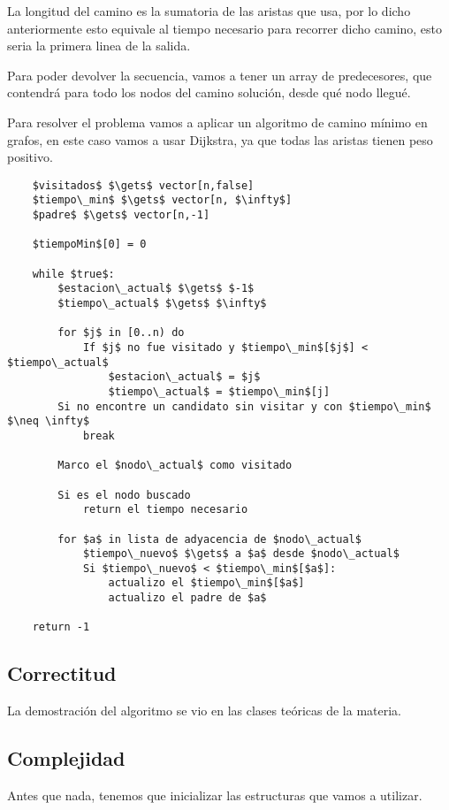 La longitud del camino es la sumatoria de las aristas que usa, por lo dicho anteriormente esto equivale al tiempo necesario para recorrer dicho camino, esto seria la primera linea de la salida.

Para poder devolver la secuencia, vamos a tener un array de predecesores, que contendrá para todo los nodos del camino solución, desde qué nodo llegué.

Para resolver el problema vamos a aplicar un algoritmo de camino mínimo en grafos, en este caso vamos a usar Dijkstra, ya que todas las aristas tienen peso positivo.

\begin{lstlisting}
    $visitados$ $\gets$ vector[n,false]
    $tiempo\_min$ $\gets$ vector[n, $\infty$]
    $padre$ $\gets$ vector[n,-1]

    $tiempoMin$[0] = 0

    while $true$:
        $estacion\_actual$ $\gets$ $-1$
        $tiempo\_actual$ $\gets$ $\infty$

        for $j$ in [0..n) do
            If $j$ no fue visitado y $tiempo\_min$[$j$] < $tiempo\_actual$
                $estacion\_actual$ = $j$
                $tiempo\_actual$ = $tiempo\_min$[j]
        Si no encontre un candidato sin visitar y con $tiempo\_min$ $\neq \infty$
            break

        Marco el $nodo\_actual$ como visitado

        Si es el nodo buscado
            return el tiempo necesario

        for $a$ in lista de adyacencia de $nodo\_actual$
            $tiempo\_nuevo$ $\gets$ a $a$ desde $nodo\_actual$
            Si $tiempo\_nuevo$ < $tiempo\_min$[$a$]:
                actualizo el $tiempo\_min$[$a$]
                actualizo el padre de $a$

    return -1
   \end{lstlisting}

\subsection{Correctitud}

La demostración del algoritmo se vio en las clases teóricas de la materia.

\subsection{Complejidad}
Antes que nada, tenemos que inicializar las estructuras que vamos a utilizar.

